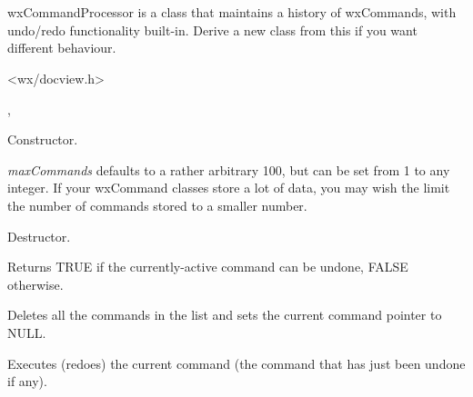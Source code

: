 \section{}\label{wxcommandprocessor}

wxCommandProcessor is a class that maintains a history of wxCommands,
with undo/redo functionality built-in. Derive a new class from this
if you want different behaviour.




<wx/docview.h>


, 




Constructor.

{\it maxCommands} defaults to a rather arbitrary 100, but can be set from 1 to any integer.
If your wxCommand classes store a lot of data, you may wish the limit the number of
commands stored to a smaller number.



Destructor.



Returns TRUE if the currently-active command can be undone, FALSE otherwise.



Deletes all the commands in the list and sets the current command pointer to NULL.



Executes (redoes) the current command (the command that has just been undone if any).

